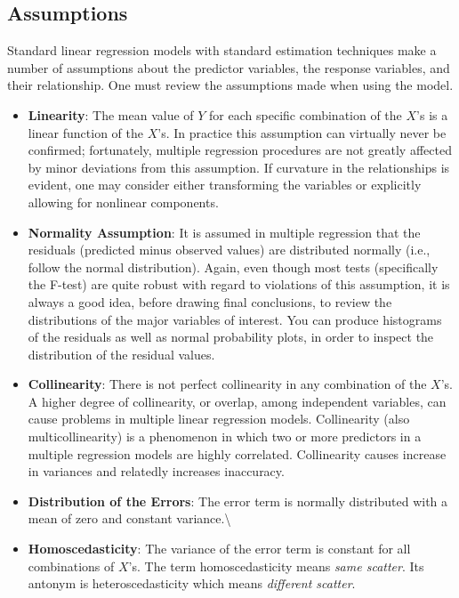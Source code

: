 \documentclass[10pt,b5paper,]{book}
\theoremstyle{definition}
\theoremstyle{definition}
\theoremstyle{definition}
\theoremstyle{remark}
\begin{document}
\hypertarget{assumptions}{%
\subsection{Assumptions}\label{assumptions}}

Standard linear regression models with standard estimation techniques
make a number of assumptions 
about the predictor variables, the response variables, and their
relationship. One must review the assumptions made when using the model.

\begin{itemize}
\item
  \textbf{Linearity}: The mean value of \(Y\) for each specific
  combination of the \(X\)'s is a linear function of the \(X\)'s. In
  practice this assumption can virtually never be confirmed;
  fortunately, multiple regression procedures are not greatly affected
  by minor deviations from this assumption. If curvature in the
  relationships is evident, one may consider either transforming the
  variables or explicitly allowing for nonlinear components.\\
\item
  \textbf{Normality Assumption}: It is assumed in multiple regression
  that the residuals (predicted minus observed values) are distributed
  normally (i.e., follow the normal distribution). Again, even though
  most tests (specifically the F-test) are quite robust with regard to
  violations of this assumption, it is always a good idea, before
  drawing final conclusions, to review the distributions of the major
  variables of interest. You can produce histograms of the residuals as
  well as normal probability plots, in order to inspect the distribution
  of the residual values.\\
\item
  \textbf{Collinearity}: There is not perfect collinearity in any
  combination of the \(X\)'s. A higher degree of collinearity, or
  overlap, among independent variables, can cause problems in multiple
  linear regression models. Collinearity (also multicollinearity) is a
  phenomenon in which two or more predictors in a multiple regression
  models are highly correlated. Collinearity causes increase in
  variances and relatedly increases inaccuracy.\\
\item
  \textbf{Distribution of the Errors}: The error term is normally
  distributed with a mean of zero and constant variance.\textbackslash{}
\item
  \textbf{Homoscedasticity}: The variance of the error term is constant
  for all combinations of \(X\)'s. The term homoscedasticity means
  \emph{same scatter}. Its antonym is heteroscedasticity which means
  \emph{different scatter}.
\end{itemize}
\end{document}
